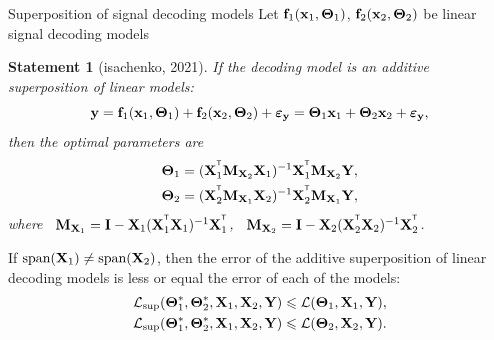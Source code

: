 \documentclass[10pt]{beamer}
\newtheorem{statement}{Statement}
\begin{document}
\begin{frame}{Superposition of signal decoding models}
	Let $\mathbf{f}_1(\bx_1, \bTheta_1)$, $\mathbf{f}_2(\bx_2, \bTheta_2)$ be linear signal decoding models
	\begin{statement}[isachenko, 2021]
		If the decoding model is an additive superposition of linear models:
		\vspace{-0.3cm}
		\[
			\by = \mathbf{f}_1(\bx_1, \bTheta_1) + \mathbf{f}_2(\bx_2, \bTheta_2) + \boldsymbol{\varepsilon}_{\by} = \bTheta_1 \bx_1 + \bTheta_2 \bx_2 + \boldsymbol{\varepsilon}_{\by},
		\]
		then the optimal parameters are
		\vspace{-0.2cm}
		\begin{align*}
			\bTheta_1 &= (\bX_1^{\T} \bM_{\bX_2} \bX_1)^{-1} \bX_1^{\T} \bM_{\bX_2} \bY, \\
			\bTheta_2 &= (\bX_2^{\T} \bM_{\bX_1} \bX_2)^{-1} \bX_2^{\T} \bM_{\bX_1} \bY,
		\end{align*}
		where \, $\bM_{\bX_1} = \bI - \bX_1 (\bX_1^{\T} \bX_1)^{-1} \bX_1^{\T}$, \, $\bM_{\bX_2} = \bI -\bX_2 (\bX_2^{\T} \bX_2)^{-1} \bX_2^{\T}$.
	\end{statement}
	\begin{theorem}[Isachenko, 2021]
		If $\text{span}(\bX_1) \neq \text{span}(\bX_2)$, then the error of the additive superposition of linear decoding models is less or equal the error of each of the models:
		\begin{align*}
			\mathcal{L}_{\textnormal{sup}}(\bTheta_1^*, \bTheta_2^*, \bX_1, \bX_2, \bY) &\leq \mathcal{L}(\bTheta_1, \bX_1, \bY), \\
			\mathcal{L}_{\textnormal{sup}}(\bTheta_1^*, \bTheta_2^*, \bX_1, \bX_2, \bY) &\leq \mathcal{L}(\bTheta_2, \bX_2, \bY).
		\end{align*}
	\end{theorem}
\end{frame}
\end{document}

